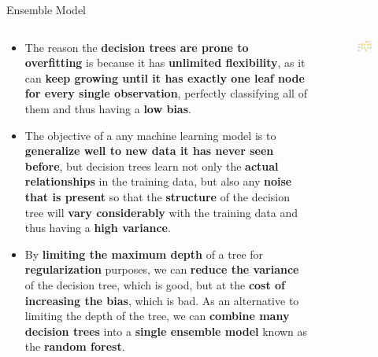 \documentclass[document.tex]{subfiles}
\begin{document}
    \begin{frame}{Ensemble Model}
        \begin{columns}
            \begin{column}{.6\textwidth}
                \begin{itemize}
                    \item The reason the \textbf{decision trees are prone to overfitting} is because it has \textbf{unlimited flexibility}, as it can \textbf{keep growing until it has exactly one leaf node for every single observation}, perfectly classifying all of them and thus having a \textbf{low bias}.
                    \item The objective of a any machine learning model is to \textbf{generalize well to new data it has never seen before}, but decision trees learn not only the \textbf{actual relationships} in the training data, but also any \textbf{noise that is present} so that the \textbf{structure} of the decision tree will \textbf{vary considerably} with the training data and thus having a \textbf{high variance}.
                    \item By \textbf{limiting the maximum depth} of a tree for \textbf{regularization} purposes, we can \textbf{reduce the variance }of the decision tree, which is good, but at the \textbf{cost of increasing the bias}, which is bad. As an alternative to limiting the depth of the tree, we can \textbf{combine many decision trees} into a \textbf{single ensemble model} known as the \textbf{random forest}.
                \end{itemize}
            \end{column}
            \begin{column}{.4\textwidth}
                \begin{figure}
                    \label{fig:bagging}
                    \includegraphics[width=\textwidth]{figures/external/bagging.png}
                \end{figure}
            \end{column}
        \end{columns}
    \end{frame}
    
\end{document}
